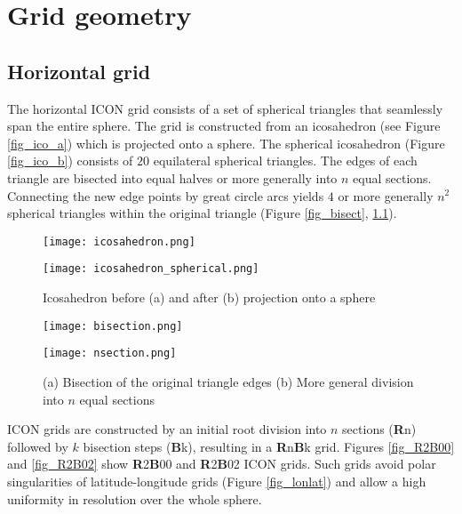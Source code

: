 \chapter{Grid geometry}

\section{Horizontal grid}
The horizontal ICON grid consists of a set of spherical triangles that seamlessly span the entire sphere. The grid is constructed from an icosahedron (see Figure 
\ref{fig_ico_a}) which is projected onto a sphere. The spherical icosahedron (Figure \ref{fig_ico_b}) consists of $20$ equilateral spherical triangles. The edges of each triangle 
are bisected into equal halves or more generally into $n$ equal sections. Connecting the new edge points by great circle arcs yields $4$ or more generally $n^2$ spherical triangles 
within the original triangle (Figure \ref{fig_bisect}, \ref{fig_nsect}). 

\begin{figure}[h]
  \begin{minipage}[b]{0.4\textwidth}
    \centering
    \texttt{[image: icosahedron.png]}
    \subcaption{}\label{fig_ico_a}
  \end{minipage}\hfill
  \begin{minipage}[b]{0.4\textwidth}
    \centering
    \texttt{[image: icosahedron\_spherical.png]}
    \subcaption{}\label{fig_ico_b}
  \end{minipage}\hfill
  \caption{Icosahedron before (a) and after (b) projection onto a sphere }

\hfill

  \begin{minipage}[b]{0.4\textwidth}
    \centering
    \texttt{[image: bisection.png]}
    \subcaption{}\label{fig_bisect}
  \end{minipage}\hfill
  \begin{minipage}[b]{0.4\textwidth}
    \centering
    \texttt{[image: nsection.png]}
    \subcaption{}\label{fig_nsect}
  \end{minipage}\hfill
  \caption{(a) Bisection of the original triangle edges (b) More general division into $n$ equal sections}
\end{figure}

ICON grids are constructed by an initial root division into $n$ sections (\textbf{R}n) followed by $k$ bisection steps (\textbf{B}k), 
resulting in a \textbf{R}n\textbf{B}k grid. Figures \ref{fig_R2B00} and \ref{fig_R2B02} show \textbf{R}2\textbf{B}00 and 
\textbf{R}2\textbf{B}02 ICON grids. Such grids avoid polar singularities of latitude-longitude grids (Figure \ref{fig_lonlat}) 
and allow a high uniformity in resolution over the whole sphere.

